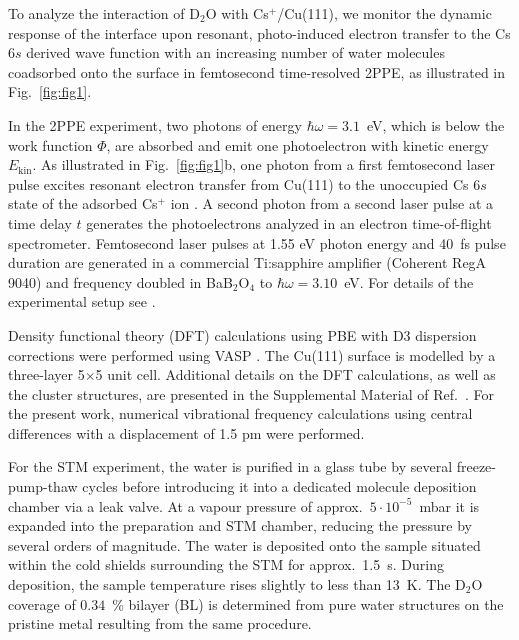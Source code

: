 \documentclass[aps,twocolumn,amssymb,amsfonts,amsmath,showpacs,final,a4paper,superscriptaddress]{revtex4-2}
\begin{document}
To analyze the interaction of D$_2$O with Cs$^+$/Cu(111), we monitor the dynamic response of the interface upon resonant, photo-induced electron transfer to the Cs $6s$ derived wave function with an increasing number of water molecules coadsorbed onto the surface in femtosecond time-resolved 2PPE, as illustrated in Fig.~\ref{fig:fig1}.

In the 2PPE experiment, two photons of energy $\hbar \omega=3.1$~eV, which is below the work function $\Phi$, are absorbed and emit one photoelectron with kinetic energy $E_{\mathrm{kin}}$. As illustrated in Fig.~\ref{fig:fig1}b, one photon from a first femtosecond laser pulse excites resonant electron transfer from Cu(111) to the unoccupied Cs $6s$ state of the adsorbed Cs$^+$ ion \cite{bauer_1997, petek_2000}. A second photon from a second laser pulse at a time delay $t$ generates the photoelectrons analyzed in an electron time-of-flight spectrometer. Femtosecond laser pulses at 1.55 eV photon energy and 40~fs pulse duration are generated in a commercial Ti:sapphire amplifier (Coherent RegA 9040) and frequency doubled in BaB$_2$O$_4$ to $\hbar \omega=3.10$~eV. For details of the experimental setup see \cite{sandhofer_2014}.

Density functional theory (DFT) calculations using PBE \cite{perdew_1996} with D3 dispersion corrections \cite{grimme_2010,grimme_2011} were performed using VASP \cite{kresse_1996a,kresse_1996b}. The Cu(111) surface is modelled by a three-layer 5$\times$5 unit cell. Additional details on the DFT calculations, as well as the cluster structures, are presented in the Supplemental Material of Ref.~\cite{penschke_2023}. For the present work, numerical vibrational frequency calculations using central differences with a displacement of 1.5 pm were performed.

For the STM experiment, the water is purified in a glass tube by several freeze-pump-thaw cycles before introducing it into a dedicated molecule deposition chamber via a leak valve. At a vapour pressure of approx.\ $5\cdot 10^{-5}$~mbar it is expanded into the preparation and STM chamber, reducing the pressure by several orders of magnitude. The water is deposited onto the sample situated within the cold shields surrounding the STM for approx.\ 1.5~s. During deposition, the sample temperature rises slightly to less than 13~K. The D$_2$O coverage %
of $0.34$~\% bilayer (BL) is determined from pure water structures on the pristine metal resulting from the same procedure.
\end{document}

